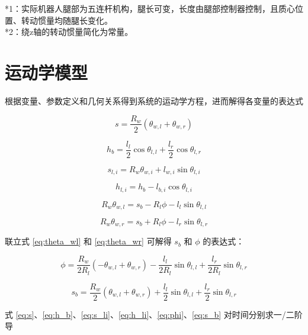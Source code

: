 *1：实际机器人腿部为五连杆机构，腿长可变，长度由腿部控制器控制，且质心位置、转动惯量均随腿长变化。\\
*2：绕z轴的转动惯量简化为常量。

\section{运动学模型}

根据变量、参数定义和几何关系得到系统的运动学方程，进而解得各变量的表达式

\begin{equation}
s = \frac{R_w}{2}(\theta_{w,l} + \theta_{w,r}) 
\label{eq:s}
\end{equation}

\begin{equation}
h_b = \frac{l_l}{2}\cos\theta_{l,l} + \frac{l_r}{2}\cos\theta_{l,r} 
\label{eq:h_b}
\end{equation}

\begin{equation}
s_{l,i} = R_w\theta_{w,i} + l_{w,i}\sin\theta_{l,i}
\label{eq:s_li}
\end{equation}

\begin{equation}
h_{l,i} = h_b - l_{b,i}\cos\theta_{l,i} 
\label{eq:h_li}
\end{equation}

\begin{equation}
R_w\theta_{w,l} = s_b - R_l\phi - l_l\sin\theta_{l,l} 
\label{eq:theta_wl}
\end{equation}

\begin{equation}
R_w\theta_{w,r} = s_b + R_l\phi - l_r\sin\theta_{l,r}
\label{eq:theta_wr}
\end{equation}

联立式 \ref{eq:theta_wl} 和 \ref{eq:theta_wr} 可解得 $s_b$ 和 $\phi$ 的表达式：

\begin{equation}
\phi = \frac{R_w}{2R_l}(-\theta_{w,l} + \theta_{w,r}) - \frac{l_l}{2R_l}\sin\theta_{l,l} + \frac{l_r}{2R_l}\sin\theta_{l,r} 
\label{eq:phi}
\end{equation}

\begin{equation}
s_b = \frac{R_w}{2}(\theta_{w,l} + \theta_{w,r}) + \frac{l_l}{2}\sin\theta_{l,l} + \frac{l_r}{2}\sin\theta_{l,r} 
\label{eq:s_b}
\end{equation}

式 \ref{eq:s}、\ref{eq:h_b}、\ref{eq:s_li}、\ref{eq:h_li}、\ref{eq:phi}、\ref{eq:s_b} 对时间分别求一/二阶导

